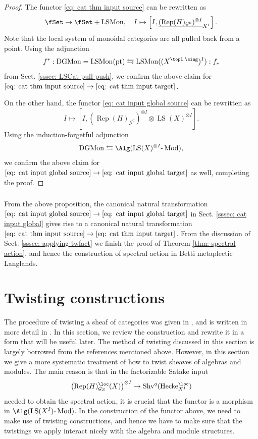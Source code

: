 \documentclass[10pt]{amsart}
\newcommand{\sssec}{\subsubsection}
\theoremstyle{remark}
\newcommand{\ul}{\underline}
\newcommand{\on}{\operatorname}
\newcommand{\cG}{\mathcal{G}}
\newcommand{\LSMon}{\on{LSMon}}
\newcommand{\DGCatMon}{\on{DGMon}}
\newcommand{\lMod}{\text{-}\on{Mod}}
\newcommand{\Rep}{\on{Rep}}
\newcommand{\Mod}{\on{Mod}}
\newcommand{\Shv}{\on{Shv}}
\newcommand{\LS}{\on{LS}}
\newcommand{\pt}{\on{pt}}
\newcommand{\Hecke}{\on{Hecke}}
\begin{document}
\begin{proof}
    The functor \eqref{eq: cat thm input source} can be rewritten as
    \[\fSet\rightarrow \fSet+\LSMon,\quad I\mapsto \left[I,\ul{(\Rep(H)_{\cG^0})^{\otimes I}}_{X^I}\right].\]
    Note that the local system of monoidal categories are all pulled back from a point. Using the adjunction
    \[f^*:\DGCatMon=\LSMon(\pt)\leftrightarrows
    \LSMon((X^{\topl,\sing})^I):f_*\]
    from Sect. \ref{sssec: LSCat pull push}, we confirm the above claim for $\eqref{eq: cat thm input source}\rightarrow \eqref{eq: cat thm input target}$. 
    \medskip

    On the other hand, the functor \eqref{eq: cat input global source} can be rewritten as
    \[I\mapsto [I, (\Rep(H)_{\cG^0})^{\otimes I}\otimes\LS(X)^{\otimes I}].\]
    Using the induction-forgetful adjunction
    \[\DGCatMon\leftrightarrows\Alg(\LS(X)^{\otimes I}\lMod),\]
    we confirm the above claim for $\eqref{eq: cat input global source}\rightarrow\eqref{eq: cat input global target}$ as well, completing the proof.
\end{proof}

\sssec{}
From the above proposition, the canonical natural transformation $\eqref{eq: cat input global source} \rightarrow \eqref{eq: cat input global target}$ in Sect. \ref{sssec: cat input global} gives rise to a canonical natural transformation $\eqref{eq: cat thm input source} \rightarrow \eqref{eq: cat thm input target}$. From the discussion of Sect. \ref{sssec: applying twfact} we finish the proof of Theorem \ref{thm: spectral action}, and hence the construction of spectral action in Betti metaplectic Langlands.









\appendix
\section{Twisting constructions}\label{sec: twisting construction}
The procedure of twisting a sheaf of categories was given in \cite[Sect. 1.7]{GL}, and is written in more detail in \cite[Appendix A]{ZhaoNew}. In this section, we review the construction and rewrite it in a form that will be useful later. The method of twisting discussed in this section is largely borrowed from the references mentioned above. However, in this section we give a more systematic treatment of how to twist sheaves of algebras and modules. The main reason is that in the factorizable Satake input 
\[\left(\Rep(H)^{\loc}_{\cG_Z}(X)\right)^{\otimes I}\rightarrow \Shv^q(\Hecke^{\loc}_{X^I})\]
needed to obtain the spectral action, it is crucial that the functor is a morphism in $\Alg(\LS(X^I)\text{-}\Mod)$. In the construction of the functor above, we need to make use of twisting constructions, and hence we have to make sure that the twistings we apply interact nicely with the algebra and module structures.
\medskip
\end{document}

